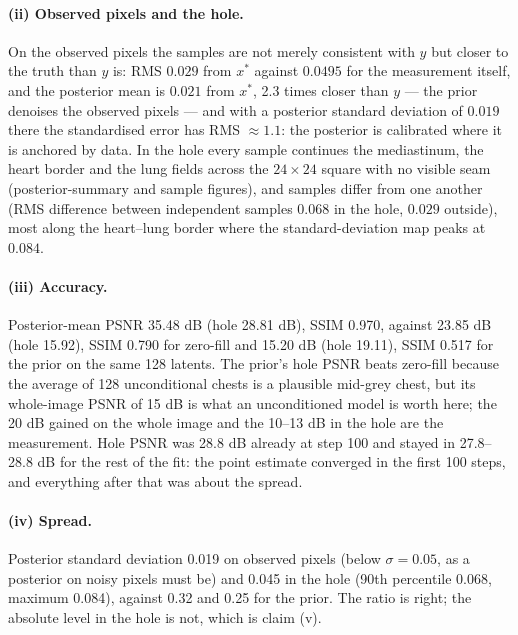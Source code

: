 \documentclass[11pt]{article}
\begin{document}
\paragraph{(ii) Observed pixels and the hole.} On the observed pixels the
samples are not merely consistent with $y$ but closer to the truth than $y$
is: RMS $0.029$ from $x^{*}$ against $0.0495$ for the measurement itself, and
the posterior mean is $0.021$ from $x^{*}$, 2.3 times closer than $y$ --- the
prior denoises the observed pixels --- and with a posterior standard
deviation of $0.019$ there the standardised error has RMS $\approx 1.1$: the
posterior is calibrated where it is anchored by data. In the hole every sample continues
the mediastinum, the heart border and the lung fields across the $24
\times 24$ square with no visible seam (posterior-summary and sample
figures), and samples differ from one another (RMS difference between
independent samples $0.068$ in the hole, $0.029$ outside), most along the
heart--lung border where the standard-deviation map peaks at $0.084$.

\paragraph{(iii) Accuracy.} Posterior-mean PSNR 35.48 dB (hole 28.81 dB),
SSIM 0.970, against 23.85 dB (hole 15.92), SSIM 0.790 for zero-fill and
15.20 dB (hole 19.11), SSIM 0.517 for the prior on the same 128 latents. The
prior's hole PSNR beats zero-fill because the average of 128 unconditional
chests is a plausible mid-grey chest, but its whole-image PSNR of 15 dB is
what an unconditioned model is worth here; the 20 dB gained on the whole
image and the 10--13 dB in the hole are the measurement. Hole PSNR was
28.8 dB already at step 100 and stayed in 27.8--28.8 dB for the rest of the
fit: the point estimate converged in the first 100 steps, and everything
after that was about the spread.

\paragraph{(iv) Spread.} Posterior standard deviation 0.019 on observed
pixels (below $\sigma = 0.05$, as a posterior on noisy pixels must be) and
0.045 in the hole (90th percentile 0.068, maximum 0.084), against 0.32 and
0.25 for the prior. The ratio is right; the absolute level in the hole is
not, which is claim (v).
\end{document}
